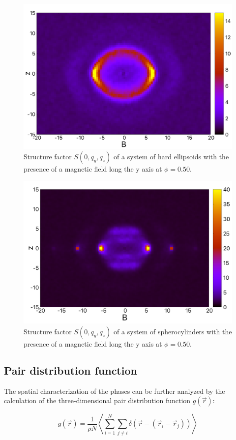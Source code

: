 \documentclass[aip,graphicx]{revtex4-1} %
\begin{document}
\begin{figure}
    \centering
    \includegraphics[width=0.7\columnwidth]{Syz_B_HE.png}
    \caption{Structure factor $S(0, q_y, q_z)$ of a system of hard ellipsoids with the presence of a magnetic field long the y axis at $\phi=0.50$.}\label{fig:Syz_B_HE}
\end{figure}

\begin{figure}
    \centering
    \includegraphics[width=0.7\columnwidth]{Syz_B.png}
    \caption{Structure factor $S(0, q_y, q_z)$ of a system of spherocylinders with the presence of a magnetic field long the y axis at $\phi=0.50$.}\label{fig:Syz_B_HSC}
\end{figure}

\subsection{Pair distribution function}

The spatial characterization of the phases can be further analyzed by  the calculation of the three-dimensional pair distribution function $g(\vec{r})$:

\begin{equation}
    g(\vec{r}) = \frac{1}{\rho N} \left\langle \sum_{i=1}^N \sum_{j\neq i} \delta \left( \vec{r} - \left( \vec{r}_i - \vec{r}_j \right) \right) \right\rangle
\end{equation}
\end{document}
